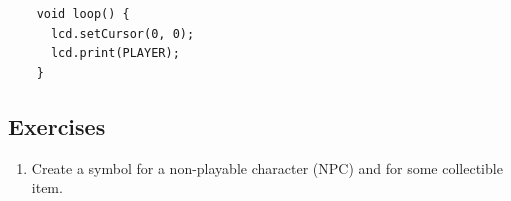 \documentclass[../sparc.tex]{subfiles}
\begin{document}
\begin{listing}[H]
  \begin{verbatim}
    void loop() {
      lcd.setCursor(0, 0);
      lcd.print(PLAYER);
    }
  \end{verbatim}
  \caption{Printing a custom symbol on the LCD screen.}
  \label{listing:game-dev-lcd-print-custom-symbol}
\end{listing}

\subsection{Exercises}
\begin{enumerate}
\item Create a symbol for a non-playable character (\gls{NPC}) and for some
  collectible item.
\end{enumerate}
\end{document}
